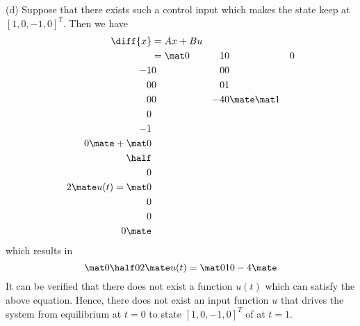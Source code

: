 (d) Suppose that there exists such a control input which makes the state keep at $[1, 0, - 1, 0]^T$. Then we have
\begin{equation}
    \begin{aligned}
        \diff{x} &= Ax + Bu \\
        &= \mat 0 &1 &0 &0 \\ -1 &0 &0 &0 \\ 0 &0 &0 &1 \\ 0 &0 &-4 &0 \mate \mat 1 \\ 0 \\ -1 \\ 0 \mate + \mat 0 \\ \half \\ 0 \\ 2 \mate u(t) = \mat 0 \\ 0 \\ 0 \\ 0 \mate
    \end{aligned}
\end{equation}
which results in 
\begin{equation}
    \mat 0 \\ \half \\ 0 \\ 2 \mate u(t) = \mat 0 \\ 1 \\ 0 \\ -4 \mate
\end{equation}
It can be verified that there does not exist a function $u(t)$ which can satisfy the above equation. Hence, there does not exist an input function $u$ that drives the system from equilibrium at $t = 0$ to state $[1, 0, - 1, 0]^T$ of at $t = 1$.


